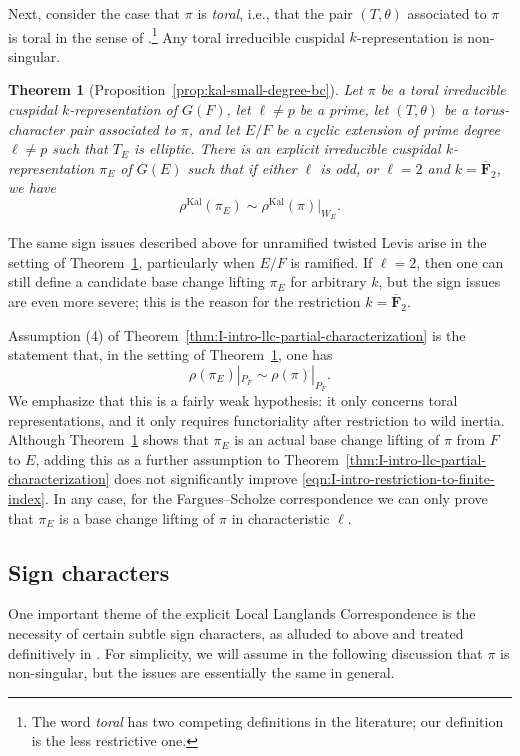 \documentclass[reqno]{amsart}
\numberwithin{equation}{subsection}
\newcommand{\F}{\mathbf{F}}
\newcommand{\ol}[1]{\overline{#1}}
\DeclareMathOperator{\Kal}{Kal}
\newtheorem{thm}{Theorem}[subsection]
\theoremstyle{remark}
\numberwithin{equation}{subsection}
\numberwithin{figure}{subsection}
\begin{document}
Next, consider the case that $\pi$ is \emph{toral}, i.e., that the pair $(T, \theta)$ associated to $\pi$ is toral in the sense of \cite[Definition 3.7]{CO21}.\footnote{The word \emph{toral} has two competing definitions in the literature; our definition is the less restrictive one.} Any toral irreducible cuspidal $k$-representation is non-singular.

\begin{thm}[Proposition~\ref{prop:kal-small-degree-bc}]\label{thm:I-intro-small-bc}
    Let $\pi$ be a toral irreducible cuspidal $k$-representation of $G(F)$, let $\ell \neq p$ be a prime, let $(T,\theta)$ be a torus-character pair associated to $\pi$, and let $E/F$ be a cyclic extension of prime degree $\ell\neq p$ such that $T_E$ is elliptic. There is an explicit irreducible cuspidal $k$-representation $\pi_E$ of $G(E)$ such that if either $\ell$ is odd, or $\ell = 2$ and $k = \ol\F_2$, we have
    \[
    \rho^{\Kal}(\pi_E) \sim \rho^{\Kal}(\pi)|_{W_E}.
    \]
\end{thm}

The same sign issues described above for unramified twisted Levis arise in the setting of Theorem~\ref{thm:I-intro-small-bc}, particularly when $E/F$ is ramified. If $\ell = 2$, then one can still define a candidate base change lifting $\pi_E$ for arbitrary $k$, but the sign issues are even more severe; this is the reason for the restriction $k = \ol\F_2$.

Assumption (4) of Theorem~\ref{thm:I-intro-llc-partial-characterization} is the statement that, in the setting of Theorem~\ref{thm:I-intro-small-bc}, one has
\[
\rho(\pi_E)|_{P_F} \sim \rho(\pi)|_{P_F}.
\]
We emphasize that this is a fairly weak hypothesis: it only concerns toral representations, and it only requires functoriality after restriction to wild inertia. Although Theorem~\ref{thm:I-intro-small-bc} shows that $\pi_E$ is an actual base change lifting of $\pi$ from $F$ to $E$, adding this as a further assumption to Theorem~\ref{thm:I-intro-llc-partial-characterization} does not significantly improve \eqref{eqn:I-intro-restriction-to-finite-index}. In any case, for the Fargues--Scholze correspondence we can only prove that $\pi_E$ is a base change lifting of $\pi$ in characteristic $\ell$.





\subsection{Sign characters}\label{ss:I-intro-proofs} One important theme of the explicit Local Langlands Correspondence is the necessity of certain subtle sign characters, as alluded to above and treated definitively in \cite{FKS23}. For simplicity, we will assume in the following discussion that $\pi$ is non-singular, but the issues are essentially the same in general. 
\end{document}
